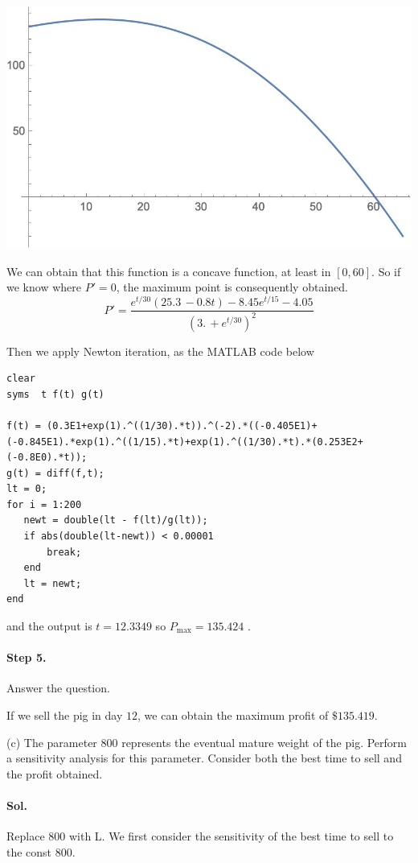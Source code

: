 \documentclass[11pt]{article}
\begin{document}
\begin{center}
	\includegraphics[scale = .5]{HW4_2}
\end{center}

We can obtain that this function is a concave function, at least in $[0,60]$. So if we know where $P' =0$, the maximum point is consequently obtained.
$$
P' = \frac{e^{t/30} (25.3\, -0.8 t)-8.45 e^{t/15}-4.05}{\left(3.\, +e^{t/30}\right)^2}
$$

Then we apply Newton iteration, as the MATLAB code below

\begin{lstlisting}
clear
syms  t f(t) g(t)

f(t) = (0.3E1+exp(1).^((1/30).*t)).^(-2).*((-0.405E1)+(-0.845E1).*exp(1).^((1/15).*t)+exp(1).^((1/30).*t).*(0.253E2+(-0.8E0).*t));
g(t) = diff(f,t);
lt = 0;
for i = 1:200
   newt = double(lt - f(lt)/g(lt));
   if abs(double(lt-newt)) < 0.00001
       break;
   end
   lt = newt;
end
\end{lstlisting}
and the output is $t = 12.3349$ so $P_{\text{max}} = 135.424$ .

\paragraph{Step 5.} Answer the question.

If we sell the pig in day $12$, we can obtain the maximum profit of $\$135.419$.

(c) The parameter 800 represents the eventual mature weight of the pig. Perform a sensitivity analysis for this parameter. Consider both the best time to sell and the profit obtained.
\paragraph{Sol.} Replace 800 with L. We first consider the sensitivity of the best time to sell to the const 800.
\end{document}
